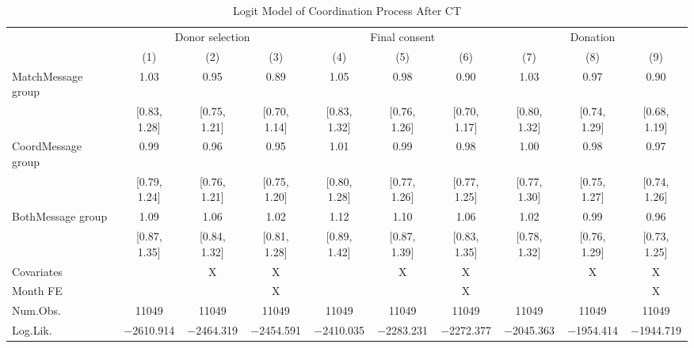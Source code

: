 \documentclass[12pt, a4paper]{article}
\begin{document}
\begin{landscape}\begin{table}[H]

\caption{\label{tab:logit-coordinate}Logit Model of Coordination Process After CT}
\centering
\fontsize{8}{10}\selectfont
\begin{threeparttable}
\begin{tabular}[t]{lccccccccc}
\toprule
\multicolumn{1}{c}{ } & \multicolumn{3}{c}{Donor selection} & \multicolumn{3}{c}{Final consent} & \multicolumn{3}{c}{Donation} \\
\cmidrule(l{3pt}r{3pt}){2-4} \cmidrule(l{3pt}r{3pt}){5-7} \cmidrule(l{3pt}r{3pt}){8-10}
  & (1) & (2) & (3) & (4) & (5) & (6) & (7) & (8) & (9)\\
\midrule
MatchMessage group & \num{1.03} & \num{0.95} & \num{0.89} & \num{1.05} & \num{0.98} & \num{0.90} & \num{1.03} & \num{0.97} & \num{0.90}\\
 & {}[\num{0.83}, \num{1.28}] & {}[\num{0.75}, \num{1.21}] & {}[\num{0.70}, \num{1.14}] & {}[\num{0.83}, \num{1.32}] & {}[\num{0.76}, \num{1.26}] & {}[\num{0.70}, \num{1.17}] & {}[\num{0.80}, \num{1.32}] & {}[\num{0.74}, \num{1.29}] & {}[\num{0.68}, \num{1.19}]\\
CoordMessage group & \num{0.99} & \num{0.96} & \num{0.95} & \num{1.01} & \num{0.99} & \num{0.98} & \num{1.00} & \num{0.98} & \num{0.97}\\
 & {}[\num{0.79}, \num{1.24}] & {}[\num{0.76}, \num{1.21}] & {}[\num{0.75}, \num{1.20}] & {}[\num{0.80}, \num{1.28}] & {}[\num{0.77}, \num{1.26}] & {}[\num{0.77}, \num{1.25}] & {}[\num{0.77}, \num{1.30}] & {}[\num{0.75}, \num{1.27}] & {}[\num{0.74}, \num{1.26}]\\
BothMessage group & \num{1.09} & \num{1.06} & \num{1.02} & \num{1.12} & \num{1.10} & \num{1.06} & \num{1.02} & \num{0.99} & \num{0.96}\\
 & {}[\num{0.87}, \num{1.35}] & {}[\num{0.84}, \num{1.32}] & {}[\num{0.81}, \num{1.28}] & {}[\num{0.89}, \num{1.42}] & {}[\num{0.87}, \num{1.39}] & {}[\num{0.83}, \num{1.35}] & {}[\num{0.78}, \num{1.32}] & {}[\num{0.76}, \num{1.29}] & {}[\num{0.73}, \num{1.25}]\\
\midrule
Covariates &  & X & X &  & X & X &  & X & X\\
Month FE &  &  & X &  &  & X &  &  & X\\
Num.Obs. & \num{11049} & \num{11049} & \num{11049} & \num{11049} & \num{11049} & \num{11049} & \num{11049} & \num{11049} & \num{11049}\\
Log.Lik. & \num{-2610.914} & \num{-2464.319} & \num{-2454.591} & \num{-2410.035} & \num{-2283.231} & \num{-2272.377} & \num{-2045.363} & \num{-1954.414} & \num{-1944.719}\\

\end{tabular}
\end{threeparttable}
\end{table}
\end{landscape}
\end{document}
